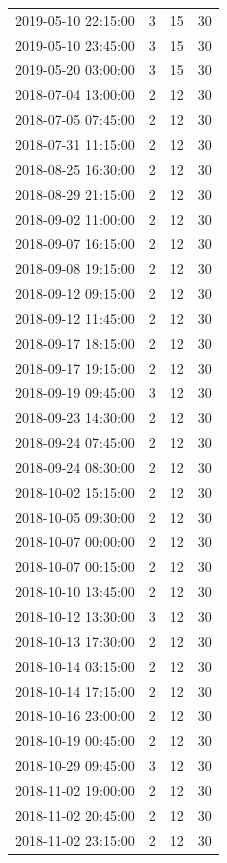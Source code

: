 \begin{tabular}{lrrr}
2019-05-10 22:15:00 & 3 & 15 & 30 \\
2019-05-10 23:45:00 & 3 & 15 & 30 \\
2019-05-20 03:00:00 & 3 & 15 & 30 \\
2018-07-04 13:00:00 & 2 & 12 & 30 \\
2018-07-05 07:45:00 & 2 & 12 & 30 \\
2018-07-31 11:15:00 & 2 & 12 & 30 \\
2018-08-25 16:30:00 & 2 & 12 & 30 \\
2018-08-29 21:15:00 & 2 & 12 & 30 \\
2018-09-02 11:00:00 & 2 & 12 & 30 \\
2018-09-07 16:15:00 & 2 & 12 & 30 \\
2018-09-08 19:15:00 & 2 & 12 & 30 \\
2018-09-12 09:15:00 & 2 & 12 & 30 \\
2018-09-12 11:45:00 & 2 & 12 & 30 \\
2018-09-17 18:15:00 & 2 & 12 & 30 \\
2018-09-17 19:15:00 & 2 & 12 & 30 \\
2018-09-19 09:45:00 & 3 & 12 & 30 \\
2018-09-23 14:30:00 & 2 & 12 & 30 \\
2018-09-24 07:45:00 & 2 & 12 & 30 \\
2018-09-24 08:30:00 & 2 & 12 & 30 \\
2018-10-02 15:15:00 & 2 & 12 & 30 \\
2018-10-05 09:30:00 & 2 & 12 & 30 \\
2018-10-07 00:00:00 & 2 & 12 & 30 \\
2018-10-07 00:15:00 & 2 & 12 & 30 \\
2018-10-10 13:45:00 & 2 & 12 & 30 \\
2018-10-12 13:30:00 & 3 & 12 & 30 \\
2018-10-13 17:30:00 & 2 & 12 & 30 \\
2018-10-14 03:15:00 & 2 & 12 & 30 \\
2018-10-14 17:15:00 & 2 & 12 & 30 \\
2018-10-16 23:00:00 & 2 & 12 & 30 \\
2018-10-19 00:45:00 & 2 & 12 & 30 \\
2018-10-29 09:45:00 & 3 & 12 & 30 \\
2018-11-02 19:00:00 & 2 & 12 & 30 \\
2018-11-02 20:45:00 & 2 & 12 & 30 \\
2018-11-02 23:15:00 & 2 & 12 & 30 \\

\end{tabular}

